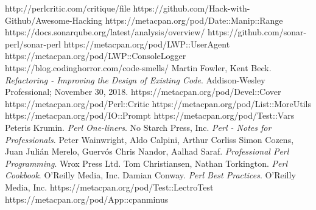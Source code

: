 \documentclass[runningheads]{llncs}
\begin{document}

\newpage
\newpage
\hfill

\newpage

\newpage

\newpage

\newpage

%
%
%
% 
% 
%
\begin{thebibliography}{8}

 http://perlcritic.com/critique/file
 https://github.com/Hack-with-Github/Awesome-Hacking
 https://metacpan.org/pod/Date::Manip::Range
 https://docs.sonarqube.org/latest/analysis/overview/
 https://github.com/sonar-perl/sonar-perl
 https://metacpan.org/pod/LWP::UserAgent
 https://metacpan.org/pod/LWP::ConsoleLogger
 https://blog.codinghorror.com/code-smells/
 Martin Fowler, Kent Beck. \textit{Refactoring - Improving the Design of Existing Code}. Addison-Wesley Professional; November 30, 2018.
 https://metacpan.org/pod/Devel::Cover
 https://metacpan.org/pod/Perl::Critic
 https://metacpan.org/pod/List::MoreUtils
 https://metacpan.org/pod/IO::Prompt
 https://metacpan.org/pod/Test::Vars
 Peteris Krumin. \textit{Perl One-liners}. No Starch Press, Inc.
 \textit{Perl - Notes for Professionals}.
 Peter Wainwright, Aldo Calpini, Arthur Corliss Simon Cozens, Juan Julián Merelo, Guervós Chris Nandor, Aalhad Saraf. \textit{Professional Perl Programming}. Wrox Press Ltd.
 Tom Christiansen, Nathan Torkington. \textit{Perl Cookbook}. O’Reilly Media, Inc.
 Damian Conway. \textit{Perl Best Practices}. O'Reilly Media, Inc.
 https://metacpan.org/pod/Test::LectroTest
 https://metacpan.org/pod/App::cpanminus
\end{thebibliography}
%
\end{document}
